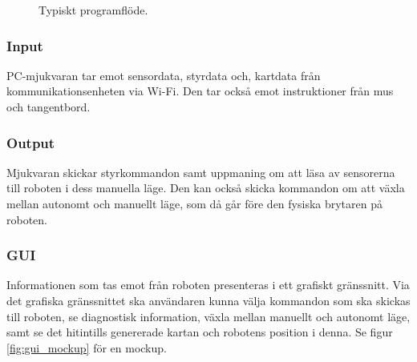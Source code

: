 \documentclass[a4paper,11pt]{article}
\begin{document}
\begin{figure}[h!]
\caption{Typiskt programflöde.}
\label{fig:gui_flowchart}
\end{figure}


\subsubsection{Input}
PC-mjukvaran tar emot sensordata, styrdata och, kartdata från kommunikationsenheten via Wi-Fi. Den tar också emot instruktioner från mus och tangentbord. 

\clearpage

\subsubsection{Output}
Mjukvaran skickar styrkommandon samt uppmaning om att läsa av sensorerna till roboten i dess manuella läge. Den kan också skicka kommandon om att växla mellan autonomt och manuellt läge, som då går före den fysiska brytaren på roboten.

\subsubsection{GUI}
Informationen som tas emot från roboten presenteras i ett grafiskt gränssnitt. Via det grafiska gränssnittet ska användaren kunna välja kommandon som ska skickas till roboten, se diagnostisk information, växla mellan manuellt och autonomt läge, samt se det hitintills genererade kartan och robotens position i denna. Se figur \ref{fig:gui_mockup} för en mockup.
\end{document}
